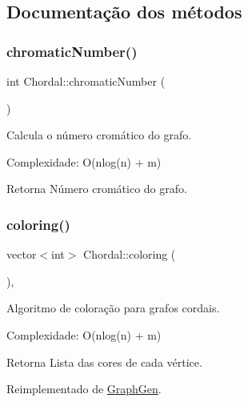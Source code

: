 \subsection{Documentação dos métodos}
\mbox{\label{classChordal_ad7e9a3c8bd7f66ad4ddc6221523e6b12}} 
\subsubsection{\texorpdfstring{chromaticNumber()}{chromaticNumber()}}
{\footnotesize\ttfamily int Chordal\+::chromatic\+Number (\begin{DoxyParamCaption}{ }\end{DoxyParamCaption})}

Calcula o número cromático do grafo.

Complexidade\+: O(nlog(n) + m) \begin{DoxyReturn}{Retorna}
Número cromático do grafo. 
\end{DoxyReturn}
\mbox{\label{classChordal_acac4822a1eb3376c29f3d193baaec91f}} 
\subsubsection{\texorpdfstring{coloring()}{coloring()}}
{\footnotesize\ttfamily vector$<$int$>$ Chordal\+::coloring (\begin{DoxyParamCaption}{ }\end{DoxyParamCaption})\hspace{0.3cm}{\ttfamily [override]}, {\ttfamily [virtual]}}

Algoritmo de coloração para grafos cordais.

Complexidade\+: O(nlog(n) + m) \begin{DoxyReturn}{Retorna}
Lista das cores de cada vértice. 
\end{DoxyReturn}


Reimplementado de \mbox{\hyperlink{classGraphGen_ad44c80646f694460fafa3e3657beb4d0}{Graph\+Gen}}.

\mbox{\label{classChordal_aa19bddaef6b83d8bdb98993cf04929b7}} 
